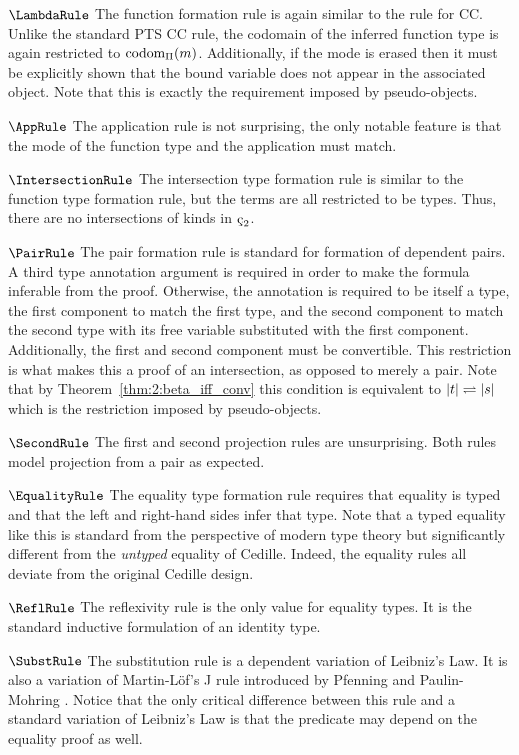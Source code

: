 $\LambdaRule$ The function formation rule is again similar to the rule for CC.
Unlike the standard PTS CC rule, the codomain of the inferred function type is again restricted to $\textnormal{codom}_\Pi(m)$.
Additionally, if the mode is erased then it must be explicitly shown that the bound variable does not appear in the associated object.
Note that this is exactly the requirement imposed by pseudo-objects.

$\AppRule$ The application rule is not surprising, the only notable feature is that the mode of the function type and the application must match.

$\IntersectionRule$ The intersection type formation rule is similar to the function type formation rule, but the terms are all restricted to be types.
Thus, there are no intersections of kinds in $\ced$.

$\PairRule$ The pair formation rule is standard for formation of dependent pairs.
A third type annotation argument is required in order to make the formula inferable from the proof.
Otherwise, the annotation is required to be itself a type, the first component to match the first type, and the second component to match the second type with its free variable substituted with the first component.
Additionally, the first and second component must be convertible.
This restriction is what makes this a proof of an intersection, as opposed to merely a pair.
Note that by Theorem~\ref{thm:2:beta_iff_conv} this condition is equivalent to $|t| \rightleftharpoons |s|$ which is the restriction imposed by pseudo-objects.

$\SecondRule$ The first and second projection rules are unsurprising.
Both rules model projection from a pair as expected.

$\EqualityRule$ The equality type formation rule requires that equality is typed and that the left and right-hand sides infer that type.
Note that a typed equality like this is standard from the perspective of modern type theory but significantly different from the \textit{untyped} equality of Cedille.
Indeed, the equality rules all deviate from the original Cedille design.



$\ReflRule$ The reflexivity rule is the only value for equality types.
It is the standard inductive formulation of an identity type.

$\SubstRule$ The substitution rule is a dependent variation of Leibniz's Law.
It is also a variation of Martin-L\"{o}f's J rule introduced by Pfenning and Paulin-Mohring \cite{pfenning1990_subst}.
Notice that the only critical difference between this rule and a standard variation of Leibniz's Law is that the predicate may depend on the equality proof as well.

